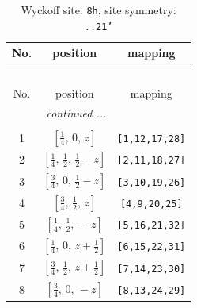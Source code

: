 \documentclass[fleqn,8pt]{jsarticle}
\begin{document}
\begin{longtable}{ccc}
\caption{Wyckoff site: {\tt 8h}, site symmetry: {\tt ..21'}}
 \\
 \hline \hline
No. & position & mapping \\ \hline \endfirsthead

\multicolumn{2}{l}{\tablename\ \thetable{}} \\
 \hline \hline
No. & position & mapping \\ \hline \endhead

 \hline \hline
\multicolumn{2}{r}{\footnotesize\it continued ...} \\ \endfoot

 \hline \hline
\multicolumn{2}{r}{} \\ \endlastfoot

1 & $\left[ \frac{1}{4},\, 0,\, z \right]$ & {\tt [1,12,17,28]} \\ \hline
2 & $\left[ \frac{1}{4},\, \frac{1}{2},\, \frac{1}{2} - z \right]$ & {\tt [2,11,18,27]} \\ \hline
3 & $\left[ \frac{3}{4},\, 0,\, \frac{1}{2} - z \right]$ & {\tt [3,10,19,26]} \\ \hline
4 & $\left[ \frac{3}{4},\, \frac{1}{2},\, z \right]$ & {\tt [4,9,20,25]} \\ \hline
5 & $\left[ \frac{1}{4},\, \frac{1}{2},\, - z \right]$ & {\tt [5,16,21,32]} \\ \hline
6 & $\left[ \frac{1}{4},\, 0,\, z + \frac{1}{2} \right]$ & {\tt [6,15,22,31]} \\ \hline
7 & $\left[ \frac{3}{4},\, \frac{1}{2},\, z + \frac{1}{2} \right]$ & {\tt [7,14,23,30]} \\ \hline
8 & $\left[ \frac{3}{4},\, 0,\, - z \right]$ & {\tt [8,13,24,29]} \\
\end{longtable}
\renewcommand{\arraystretch}{1.2}
\end{document}
